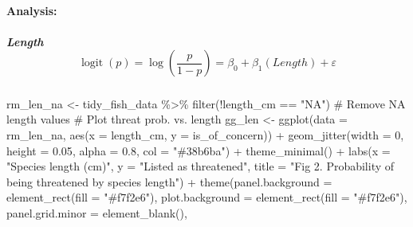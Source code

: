 \documentclass[
  letterpaper,
  DIV=11,
  numbers=noendperiod]{scrartcl}
\let\oldparagraph\paragraph
\renewcommand{\paragraph}[1]{\oldparagraph{#1}\mbox{}}
\let\oldsubparagraph\subparagraph
\renewcommand{\subparagraph}[1]{\oldsubparagraph{#1}\mbox{}}
\newenvironment{Shaded}{\begin{snugshade}}{\end{snugshade}}
\newcommand{\AttributeTok}[1]{\textcolor[rgb]{0.40,0.45,0.13}{#1}}
\newcommand{\CommentTok}[1]{\textcolor[rgb]{0.37,0.37,0.37}{#1}}
\newcommand{\DecValTok}[1]{\textcolor[rgb]{0.68,0.00,0.00}{#1}}
\newcommand{\FloatTok}[1]{\textcolor[rgb]{0.68,0.00,0.00}{#1}}
\newcommand{\FunctionTok}[1]{\textcolor[rgb]{0.28,0.35,0.67}{#1}}
\newcommand{\NormalTok}[1]{\textcolor[rgb]{0.00,0.23,0.31}{#1}}
\newcommand{\OtherTok}[1]{\textcolor[rgb]{0.00,0.23,0.31}{#1}}
\newcommand{\SpecialCharTok}[1]{\textcolor[rgb]{0.37,0.37,0.37}{#1}}
\newcommand{\StringTok}[1]{\textcolor[rgb]{0.13,0.47,0.30}{#1}}
\begin{document}
\hypertarget{analysis}{%
\paragraph{Analysis:}\label{analysis}}

\hypertarget{length-operatornamelogitplog-leftfracp1-prightbeta_0beta_1-length-varepsilon}{%
\subparagraph{\texorpdfstring{\textbf{Length}
\[\operatorname{logit}(p)=\log \left(\frac{p}{1-p}\right)=\beta_0+\beta_1  (Length)  +\varepsilon \]}{Length \textbackslash operatorname\{logit\}(p)=\textbackslash log \textbackslash left(\textbackslash frac\{p\}\{1-p\}\textbackslash right)=\textbackslash beta\_0+\textbackslash beta\_1  (Length)  +\textbackslash varepsilon }}\label{length-operatornamelogitplog-leftfracp1-prightbeta_0beta_1-length-varepsilon}}

\begin{Shaded}
\begin{Highlighting}[]
\NormalTok{rm\_len\_na }\OtherTok{\textless{}{-}}\NormalTok{ tidy\_fish\_data }\SpecialCharTok{\%\textgreater{}\%} 
  \FunctionTok{filter}\NormalTok{(}\SpecialCharTok{!}\NormalTok{length\_cm }\SpecialCharTok{==} \StringTok{"NA"}\NormalTok{) }\CommentTok{\# Remove NA length values}
\CommentTok{\# Plot threat prob. vs. length}
\NormalTok{gg\_len }\OtherTok{\textless{}{-}} \FunctionTok{ggplot}\NormalTok{(}\AttributeTok{data =}\NormalTok{ rm\_len\_na, }\FunctionTok{aes}\NormalTok{(}\AttributeTok{x =}\NormalTok{ length\_cm, }
                             \AttributeTok{y =}\NormalTok{ is\_of\_concern)) }\SpecialCharTok{+}
  \FunctionTok{geom\_jitter}\NormalTok{(}\AttributeTok{width =} \DecValTok{0}\NormalTok{, }\AttributeTok{height =} \FloatTok{0.05}\NormalTok{, }
              \AttributeTok{alpha =} \FloatTok{0.8}\NormalTok{, }\AttributeTok{col =} \StringTok{"\#38b6ba"}\NormalTok{) }\SpecialCharTok{+}
  \FunctionTok{theme\_minimal}\NormalTok{() }\SpecialCharTok{+}
  \FunctionTok{labs}\NormalTok{(}\AttributeTok{x =} \StringTok{"Species length (cm)"}\NormalTok{, }
       \AttributeTok{y =} \StringTok{"Listed as threatened"}\NormalTok{, }
       \AttributeTok{title =} \StringTok{"Fig 2. Probability of being threatened by species length"}\NormalTok{) }\SpecialCharTok{+}
  \FunctionTok{theme}\NormalTok{(}\AttributeTok{panel.background =} \FunctionTok{element\_rect}\NormalTok{(}\AttributeTok{fill =} \StringTok{"\#f7f2e6"}\NormalTok{),}
        \AttributeTok{plot.background =} \FunctionTok{element\_rect}\NormalTok{(}\AttributeTok{fill =} \StringTok{"\#f7f2e6"}\NormalTok{),}
        \AttributeTok{panel.grid.minor =} \FunctionTok{element\_blank}\NormalTok{(),}

\end{Highlighting}
\end{Shaded}
\end{document}

